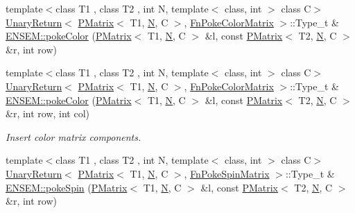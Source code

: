 \begin{DoxyCompactItemize}
\item 
{\footnotesize template$<$class T1 , class T2 , int N, template$<$ class, int $>$ class C$>$ }\\\mbox{\hyperlink{structENSEM_1_1UnaryReturn}{Unary\+Return}}$<$ \mbox{\hyperlink{classENSEM_1_1PMatrix}{P\+Matrix}}$<$ T1, \mbox{\hyperlink{operator__name__util_8cc_a7722c8ecbb62d99aee7ce68b1752f337}{N}}, C $>$, \mbox{\hyperlink{structENSEM_1_1FnPokeColorMatrix}{Fn\+Poke\+Color\+Matrix}} $>$\+::Type\+\_\+t \& \mbox{\hyperlink{group__primmatrix_ga0cfeefefe2bd8b4e365ac10d8853664a}{E\+N\+S\+E\+M\+::poke\+Color}} (\mbox{\hyperlink{classENSEM_1_1PMatrix}{P\+Matrix}}$<$ T1, \mbox{\hyperlink{operator__name__util_8cc_a7722c8ecbb62d99aee7ce68b1752f337}{N}}, C $>$ \&l, const \mbox{\hyperlink{classENSEM_1_1PMatrix}{P\+Matrix}}$<$ T2, \mbox{\hyperlink{operator__name__util_8cc_a7722c8ecbb62d99aee7ce68b1752f337}{N}}, C $>$ \&r, int row)
\item 
{\footnotesize template$<$class T1 , class T2 , int N, template$<$ class, int $>$ class C$>$ }\\\mbox{\hyperlink{structENSEM_1_1UnaryReturn}{Unary\+Return}}$<$ \mbox{\hyperlink{classENSEM_1_1PMatrix}{P\+Matrix}}$<$ T1, \mbox{\hyperlink{operator__name__util_8cc_a7722c8ecbb62d99aee7ce68b1752f337}{N}}, C $>$, \mbox{\hyperlink{structENSEM_1_1FnPokeColorMatrix}{Fn\+Poke\+Color\+Matrix}} $>$\+::Type\+\_\+t \& \mbox{\hyperlink{group__primmatrix_gab840db69dc60bcb095f46b69353d09f3}{E\+N\+S\+E\+M\+::poke\+Color}} (\mbox{\hyperlink{classENSEM_1_1PMatrix}{P\+Matrix}}$<$ T1, \mbox{\hyperlink{operator__name__util_8cc_a7722c8ecbb62d99aee7ce68b1752f337}{N}}, C $>$ \&l, const \mbox{\hyperlink{classENSEM_1_1PMatrix}{P\+Matrix}}$<$ T2, \mbox{\hyperlink{operator__name__util_8cc_a7722c8ecbb62d99aee7ce68b1752f337}{N}}, C $>$ \&r, int row, int col)
\begin{DoxyCompactList}\small\item\em Insert color matrix components. \end{DoxyCompactList}\item 
{\footnotesize template$<$class T1 , class T2 , int N, template$<$ class, int $>$ class C$>$ }\\\mbox{\hyperlink{structENSEM_1_1UnaryReturn}{Unary\+Return}}$<$ \mbox{\hyperlink{classENSEM_1_1PMatrix}{P\+Matrix}}$<$ T1, \mbox{\hyperlink{operator__name__util_8cc_a7722c8ecbb62d99aee7ce68b1752f337}{N}}, C $>$, \mbox{\hyperlink{structENSEM_1_1FnPokeSpinMatrix}{Fn\+Poke\+Spin\+Matrix}} $>$\+::Type\+\_\+t \& \mbox{\hyperlink{group__primmatrix_ga738f0f1d3bad8770111452c72714a4ae}{E\+N\+S\+E\+M\+::poke\+Spin}} (\mbox{\hyperlink{classENSEM_1_1PMatrix}{P\+Matrix}}$<$ T1, \mbox{\hyperlink{operator__name__util_8cc_a7722c8ecbb62d99aee7ce68b1752f337}{N}}, C $>$ \&l, const \mbox{\hyperlink{classENSEM_1_1PMatrix}{P\+Matrix}}$<$ T2, \mbox{\hyperlink{operator__name__util_8cc_a7722c8ecbb62d99aee7ce68b1752f337}{N}}, C $>$ \&r, int row)

\end{DoxyCompactItemize}
